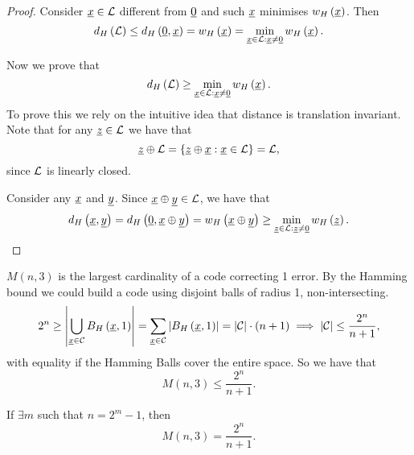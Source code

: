\begin{proof}
	Consider $\underline{x} \in \mathcal{L}$ different from $\underline{0}$ and such $\underline{x}$ minimises $w_H\left(\underline{x}\right)$.
	Then
	\begin{equation*}
		d_H \left({\mathcal{L}}\right) \le d_H \left({\underline{0}, \underline{x}}\right) = w_H\left(\underline{x}\right) = \min_{\underline{x} \in \mathcal{L} : \underline{x} \neq \underline{0}} w_H\left(\underline{x}\right).
	\end{equation*}

	Now we prove that
	\begin{equation*}
		d_H \left({\mathcal{L}}\right) \ge \min_{\underline{x} \in \mathcal{L} : \underline{x} \neq \underline{0}} w_H\left(\underline{x}\right).
	\end{equation*}
	To prove this we rely on the intuitive idea that distance is translation invariant.
	Note that for any $\underline{z} \in \mathcal{L}$ we have that
	\begin{equation*}
		\underline{z} \oplus \mathcal{L}
		=
		\left\{ \underline{z} \oplus \underline{x} : \underline{x} \in \mathcal{L} \right\}
		=
		\mathcal{L},
	\end{equation*}
	since $\mathcal{L}$ is linearly closed.

	Consider any $\underline{x}$ and $\underline{y}$.
	Since $\underline{x} \oplus \underline{y} \in \mathcal{L}$, we have that
	\begin{equation*}
		d_H \left({\underline{x}, \underline{y}}\right)
		=
		d_H \left({\underline{0}, \underline{x} \oplus \underline{y}}\right)
		=
		w_H\left(\underline{x} \oplus \underline{y}\right)
		\ge
		\min_{\underline{z} \in \mathcal{L} : \underline{z} \neq \underline{0}} w_H\left(\underline{z}\right). \qedhere
	\end{equation*}
\end{proof}

$M(n, 3)$ is the largest cardinality of a code correcting 1 error.
By the Hamming bound we could build a code using disjoint balls of radius 1, non-intersecting.
\begin{equation*}
	2^n
	\ge
	\left|{\bigcup_{\underline{x} \in \mathcal{C}} B_H\left(\underline{x}, 1\right)}\right|
	=
	\sum_{\underline{x} \in \mathcal{C}} \left|{B_H\left(\underline{x}, 1\right)}\right|
	=
	\left|{\mathcal{C}}\right| \cdot (n + 1)
	\implies
	\left|{\mathcal{C}}\right| \le \frac{2^n}{n+1},
\end{equation*}
with equality if the Hamming Balls cover the entire space.
So we have that
\begin{equation*}
	M(n, 3) \le \frac{2^n}{n+1}.
\end{equation*}

\begin{thm}[Hamming]
	If $\exists m$ such that $n = 2^m - 1$, then
	\begin{equation*}
		M(n, 3) = \frac{2^n}{n+1}.
	\end{equation*}
\end{thm}

